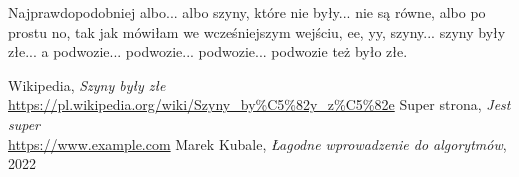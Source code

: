 \documentclass{article}
\begin{document}
Najprawdopodobniej albo... albo szyny, 
które nie były... nie są równe, 
albo po prostu no, tak jak mówiłam we 
wcześniejszym wejściu, ee, yy, szyny... 
szyny były złe... a podwozie... podwozie... 
podwozie... podwozie też było złe. \cite{szyny}

\renewcommand{\refname}{Źródła}
\begin{thebibliography}{100}
     Wikipedia, 
    \textit{Szyny były złe} 
    \\\url{https://pl.wikipedia.org/wiki/Szyny_by%C5%82y_z%C5%82e}
     Super strona,
    \textit{Jest super}
    \\\url{https://www.example.com}
     Marek Kubale,
    \textit{Łagodne wprowadzenie do algorytmów}, 2022
\end{thebibliography}
\end{document}
